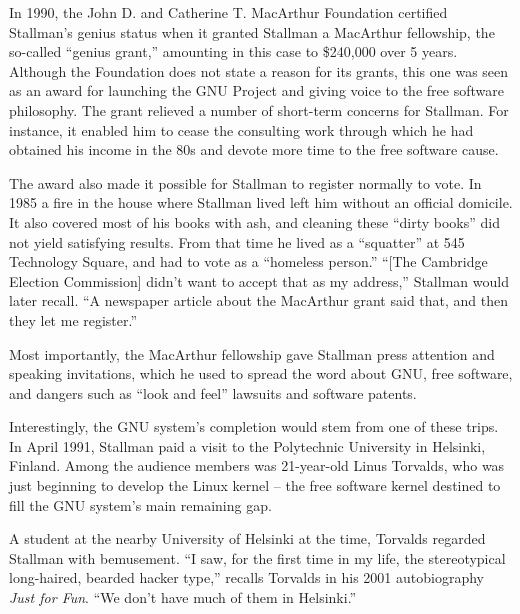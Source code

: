 In 1990, the John D. and Catherine T. MacArthur Foundation certified Stallman's genius status when it granted Stallman a MacArthur fellowship, the so-called ``genius grant,'' amounting in this case to \$240,000 over 5 years. Although the Foundation does not state a reason for its grants, this one was seen as an award for launching the GNU Project and giving voice to the free software philosophy.  The grant relieved a number of short-term concerns for Stallman.  For instance, it enabled him to cease the consulting work through which he had obtained his income in the 80s and devote more time to the free software cause.

The award also made it possible for Stallman to register normally to vote. In 1985 a fire in the house where Stallman lived left him without an official domicile.  It also covered most of his books with ash, and cleaning these ``dirty books'' did not yield satisfying results. From that time he lived as a ``squatter'' at 545 Technology Square, and had to vote as a ``homeless person.'' ``[The Cambridge Election Commission] didn't want to accept that as my address,'' Stallman would later recall. ``A newspaper article about the MacArthur grant said that, and then they let me register.''

Most importantly, the MacArthur fellowship gave Stallman press attention and speaking invitations, which he used to spread the word about GNU, free software, and dangers such as ``look and feel'' lawsuits and software patents.

Interestingly, the GNU system's completion would stem from one of these trips. In April 1991, Stallman paid a visit to the Polytechnic University in Helsinki, Finland. Among the audience members was 21-year-old Linus Torvalds, who was just beginning to develop the Linux kernel -- the free software kernel destined to fill the GNU system's main remaining gap.

A student at the nearby University of Helsinki at the time, Torvalds regarded Stallman with bemusement. ``I saw, for the first time in my life, the stereotypical long-haired, bearded hacker type,'' recalls Torvalds in his 2001 autobiography \textit{Just for Fun}. ``We don't have much of them in Helsinki.''

